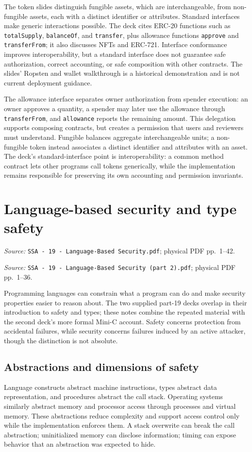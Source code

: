 \documentclass[11pt,a4paper]{article}
\newcommand{\currentmodule}{Contents}
\newcommand{\source}[2]{\textcolor{muted}{\small\textit{Source:} \nolinkurl{#1}; physical PDF pp.~#2.}\par\medskip}
\newcommand{\module}[2]{\par\Needspace{8\baselineskip}\gdef\currentmodule{#1}\section{#1}\label{#2}}
\numberwithin{figure}{section}
\begin{document}
The token slides distinguish fungible assets, which are interchangeable, from non-fungible assets, each with a distinct identifier or attributes. Standard interfaces make generic interactions possible. The deck cites ERC-20 functions such as \texttt{totalSupply}, \texttt{balanceOf}, and \texttt{transfer}, plus allowance functions \texttt{approve} and \texttt{transferFrom}; it also discusses NFTs and ERC-721. Interface conformance improves interoperability, but a standard interface does not guarantee safe authorization, correct accounting, or safe composition with other contracts. The slides' Ropsten and wallet walkthrough is a historical demonstration and is not current deployment guidance.

The allowance interface separates owner authorization from spender execution: an owner approves a quantity, a spender may later use the allowance through \texttt{transferFrom}, and \texttt{allowance} reports the remaining amount. This delegation supports composing contracts, but creates a permission that users and reviewers must understand. Fungible balances aggregate interchangeable units; a non-fungible token instead associates a distinct identifier and attributes with an asset. The deck's standard-interface point is interoperability: a common method contract lets other programs call tokens generically, while the implementation remains responsible for preserving its own accounting and permission invariants.

\module{Language-based security and type safety}{sec:language-security}
\source{SSA - 19 - Language-Based Security.pdf}{1--42}
\source{SSA - 19 - Language-Based Security (part 2).pdf}{1--36}
Programming languages can constrain what a program can do and make security properties easier to reason about. The two supplied part-19 decks overlap in their introduction to safety and types; these notes combine the repeated material with the second deck's more formal Mini-C account. Safety concerns protection from accidental failures, while security concerns failures induced by an active attacker, though the distinction is not absolute.

\subsection{Abstractions and dimensions of safety}
Language constructs abstract machine instructions, types abstract data representation, and procedures abstract the call stack. Operating systems similarly abstract memory and processor access through processes and virtual memory. These abstractions reduce complexity and support access control only while the implementation enforces them. A stack overwrite can break the call abstraction; uninitialized memory can disclose information; timing can expose behavior that an abstraction was expected to hide.
\end{document}
